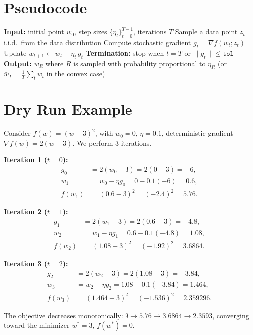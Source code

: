 \documentclass[11pt]{article}
\begin{document}
\section*{Pseudocode}
\begin{algorithm}[H]
\caption{Stochastic Gradient Descent (SGD)}
\begin{algorithmic}[1]
\State \textbf{Input:} initial point $w_0$, step sizes $\{\eta_t\}_{t=0}^{T-1}$, iterations $T$
    \State Sample a data point $z_t$ i.i.d.\ from the data distribution
    \State Compute stochastic gradient $g_t=\nabla f(w_t;z_t)$
    \State Update $w_{t+1}\gets w_t-\eta_t\,g_t$
\EndFor
\State \textbf{Termination:} stop when $t=T$ or $\|g_t\|\le\texttt{tol}$
\State \textbf{Output:} $w_R$ where $R$ is sampled with probability proportional to $\eta_R$ (or $\bar w_T=\frac{1}{T}\sum_t w_t$ in the convex case)
\end{algorithmic}
\end{algorithm}

\section*{Dry Run Example}
Consider $f(w)=(w-3)^2$, with $w_0=0$, $\eta=0.1$, deterministic gradient
$\nabla f(w)=2(w-3)$. We perform $3$ iterations.

\textbf{Iteration 1 ($t=0$):}
\begin{align*}
g_0 &= 2(w_0-3)=2(0-3)=-6,\\
w_1 &= w_0-\eta g_0 = 0-0.1(-6)=0.6,\\
f(w_1) &= (0.6-3)^2=(-2.4)^2=5.76.
\end{align*}

\textbf{Iteration 2 ($t=1$):}
\begin{align*}
g_1 &= 2(w_1-3)=2(0.6-3)=-4.8,\\
w_2 &= w_1-\eta g_1 = 0.6-0.1(-4.8)=1.08,\\
f(w_2) &= (1.08-3)^2=(-1.92)^2=3.6864.
\end{align*}

\textbf{Iteration 3 ($t=2$):}
\begin{align*}
g_2 &= 2(w_2-3)=2(1.08-3)=-3.84,\\
w_3 &= w_2-\eta g_2 = 1.08-0.1(-3.84)=1.464,\\
f(w_3) &= (1.464-3)^2=(-1.536)^2=2.359296.
\end{align*}

The objective decreases monotonically: $9 \to 5.76 \to 3.6864 \to 2.3593$,
converging toward the minimizer $w^*=3$, $f(w^*)=0$.
\end{document}
